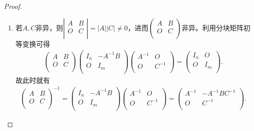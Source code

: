 \documentclass[../../main.tex]{subfiles}%
\begin{document}
\begin{proof}
\begin{enumerate}
\item 若\(A,C\)非异，则\(\left| \begin{matrix} A&B\\ O&C\\ \end{matrix} \right|=\left| A \right|\left| C \right|\ne 0\)，进而\(\left( \begin{matrix} A&B\\ O&C\\ \end{matrix} \right)\)非异。利用分块矩阵初等变换可得
\begin{align*}
\left( \begin{matrix} A&B\\ O&C\\ \end{matrix} \right) 
\left( \begin{matrix} I_n&-A^{-1}B\\ O&I_m\\ \end{matrix} \right) 
\left( \begin{matrix} A^{-1}&O\\ O&C^{-1}\\ \end{matrix} \right) 
=
\left( \begin{matrix} I_n&O\\ O&I_m\\ \end{matrix} \right).
\end{align*}
故此时就有
\begin{align*}
\left( \begin{matrix} A&B\\ O&C\\ \end{matrix} \right)^{-1}
=
\left( \begin{matrix} I_n&-A^{-1}B\\ O&I_m\\ \end{matrix} \right) 
\left( \begin{matrix} A^{-1}&O\\ O&C^{-1}\\ \end{matrix} \right) 
=
\left( \begin{matrix} A^{-1}&-A^{-1}BC^{-1}\\ O&C^{-1}\\ \end{matrix} \right).
\end{align*}

\end{enumerate}
\end{proof}
\end{document}
